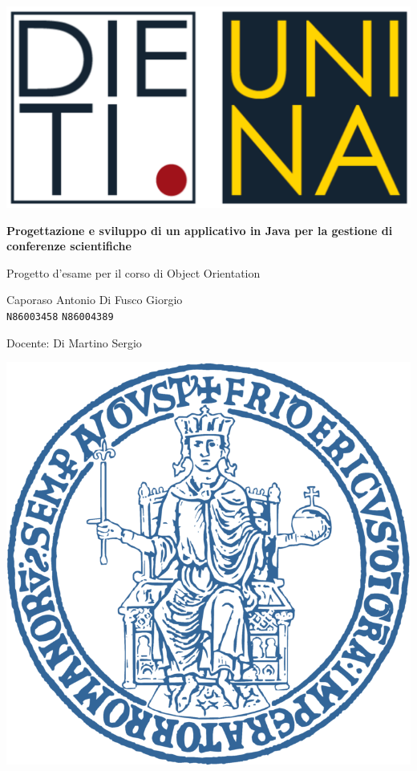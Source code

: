 \documentclass[a4paper, oneside, 12pt]{book}
\begin{document}
\begin{titlepage}
\begin{center}

\includegraphics[scale=0.6]{Immagini/logo_dieti.png}
\vspace*{1cm}

{\Huge{\textbf{Progettazione e sviluppo di un applicativo in Java per la gestione di conferenze scientifiche}}}

\vspace{1cm}

{\Large Progetto d'esame per il corso di Object Orientation}


\vfill

{\Large Caporaso Antonio} \qquad \Large{Di Fusco Giorgio}\\
\texttt{N86003458} \qquad \texttt{N86004389}

\vspace{1cm}
Docente: Di Martino Sergio

\vspace{1cm}

\includegraphics[scale=0.6]{Immagini/LogoUnina.png}



\end{center}
\end{titlepage}
\end{document}
